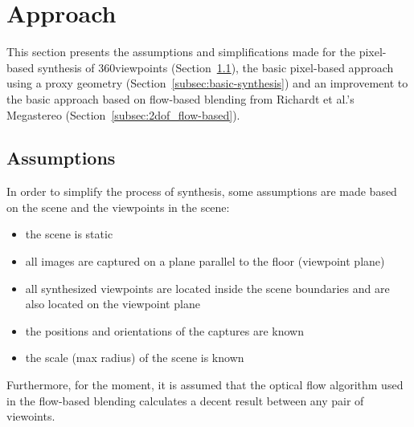 
\section{Approach} \label{sec:approach}
This section presents the assumptions and simplifications made for the pixel-based synthesis of 360\degree viewpoints (Section~\ref{subsec:assumptions}), the basic pixel-based approach using a proxy geometry (Section~\ref{subsec:basic-synthesis}) and an improvement to the basic approach based on flow-based blending from Richardt et al.'s Megastereo \cite{megastereo} (Section~\ref{subsec:2dof_flow-based}).

\subsection{Assumptions}\label{subsec:assumptions}
In order to simplify the process of synthesis, some assumptions are made based on the scene and the viewpoints in the scene:

\begin{itemize}
  \item the scene is static
  \item all images are captured on a plane parallel to the floor (viewpoint plane)
  \item all synthesized viewpoints are located inside the scene boundaries and are also located on the viewpoint plane
  \item the positions and orientations of the captures are known
  \item the scale (max radius) of the scene is known
\end{itemize}

Furthermore, for the moment, it is assumed that the optical flow algorithm used in the flow-based blending calculates a decent result between any pair of viewoints.

